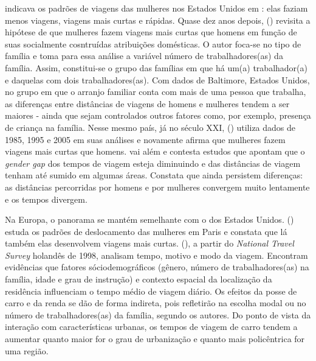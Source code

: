  indicava os padrões de viagens das mulheres nos Estados Unidos em \citeyear{FOX1983}: elas faziam menos viagens, viagens mais curtas e rápidas. Quase dez anos depois,  (\citeyear{IBIPO1992}) revisita a hipótese de que mulheres fazem viagens mais curtas que homens em função de suas socialmente cosntruídas atribuições domésticas. O autor foca-se no tipo de família e toma para essa análise a variável número de trabalhadores(as) da família. Assim, constitui-se o grupo das famílias em que há um(a) trabalhador(a) e daquelas com dois trabalhadores(as). Com dados de Baltimore, Estados Unidos, no grupo em que o arranjo familiar conta com mais de uma pessoa que trabalha, as diferenças entre distâncias de viagens de homens e mulheres tendem a ser maiores - ainda que sejam controlados outros fatores como, por exemplo, presença de criança na família.
Nesse mesmo país, já no século XXI,  (\citeyear{CRANE2007}) utiliza dados de 1985, 1995 e 2005 em suas análises e novamente afirma que mulheres fazem viagens mais curtas que homens.  vai além e contesta estudos que apontam que o \emph{gender gap} dos tempos de viagem esteja diminuindo e das distâncias de viagem tenham até sumido em algumas áreas. Constata que ainda persistem diferenças: as distâncias percorridas por homens e por mulheres convergem muito lentamente e os tempos divergem.

Na Europa, o panorama se mantém semelhante com o dos Estados Unidos.  (\citeyear{FAGNANI1983}) estuda os padrões de deslocamento das mulheres em Paris e constata que lá também elas desenvolvem viagens mais curtas.
 (\citeyear{SCHWANEN2002}), a partir do \emph{National Travel Survey} holandês de 1998, analisam tempo, motivo e modo da viagem. Encontram evidências que fatores sóciodemográficos (gênero, número de trabalhadores(as) na família, idade e grau de instrução) e contexto espacial da localização da residência influenciam o tempo médio de viagem diário. Os efeitos da posse de carro e da renda se dão de forma indireta, pois refletirão na escolha modal ou no número de trabalhadores(as) da família, segundo os autores. Do ponto de vista da interação com características urbanas, os tempos de viagem de carro tendem a aumentar quanto maior for o grau de urbanização e quanto mais policêntrica for uma região.

